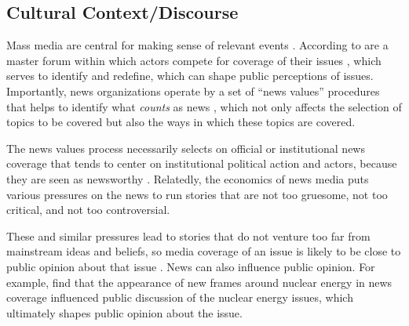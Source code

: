

\subsection{Cultural Context/Discourse}

Mass media are central for making sense of relevant events \citep{gamson_and_modigliani_1989}. According to \citet{ferree_et_al_2002} are a master forum within which actors compete for coverage of their issues \citep{amenta_et_al_2012}, which serves to identify and redefine, which can shape public perceptions of issues. Importantly, news organizations operate by a set of ``news values'' procedures that helps to identify what \textit{counts} as news \citep{amenta_et_al_2012,galtung_and_ruge_1965}, which not only affects the selection of topics to be covered \citep{galtung_and_ruge_1965} but also the ways in which these topics are covered.

The news values process necessarily selects on official or institutional news coverage \citep{schudson_2002,gitlin_1980,gans_1979} that tends to center on institutional political action and actors, because they are seen as newsworthy \citep{amenta_et_al_2012}. Relatedly, the economics of news media puts various pressures on the news to run stories that are not too gruesome, not too critical, and not too controversial. 

These and similar pressures lead to stories that do not venture too far from mainstream ideas and beliefs, so media coverage of an issue is likely to be close to public opinion about that issue \citep{gamson_and_modigliani_1989}. News can also influence public opinion. For example, \citep{gamson_and_modigliani_1989} find that the appearance of new frames around nuclear energy in news coverage influenced public discussion of the nuclear energy issues, which ultimately shapes public opinion about the issue.

